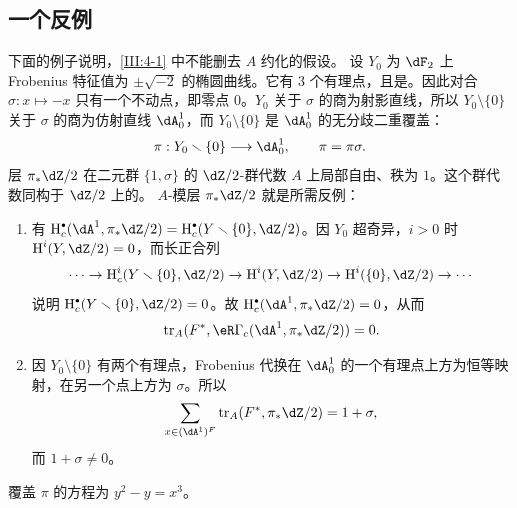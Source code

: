 \subsection{一个反例}\label{III:4-5}
下面的例子说明，\ref{III:4-1} 中不能删去 $A$ 约化的假设。
设 $Y_0$ 为 $\dF_2$ 上 Frobenius 特征值为 $\pm\sqrt{-2}$ 的椭圆曲线。它有 $3$ 个有理点，且是。因此对合 $\sigma:x\mapsto-x$ 只有一个不动点，即零点 $0$。$Y_0$ 关于 $\sigma$ 的商为射影直线，所以 $Y_0\setminus\{0\}$ 关于 $\sigma$ 的商为仿射直线 $\dA_0^1$，而 $Y_0\setminus\{0\}$ 是 $\dA_0^1$ 的无分歧二重覆盖：
\[\pi:Y_0\setminus\{0\}\longrightarrow\dA_0^1,\qquad\pi=\pi\sigma.\]
层 $\pi_*\dZ/2$ 在二元群 $\{1,\sigma\}$ 的 $\dZ/2$-群代数 $A$ 上局部自由、秩为 $1$。这个群代数同构于 $\dZ/2$ 上的。
$A$-模层 $\pi_*\dZ/2$ 就是所需反例：
\begin{enumerate}[\indent a)]
\item 有 $\h_c^\bullet(\dA^1,\pi_*\dZ/2)=\h_c^\bullet(Y\setminus\{0\},\dZ/2)$。因 $Y_0$ 超奇异，$i>0$ 时 $\h^i(Y,\dZ/2)=0$，而长正合列
\[\cdots\to\h_c^i(Y\setminus\{0\},\dZ/2)\to\h^i(Y,\dZ/2)\to\h^i(\{0\},\dZ/2)\to\cdots\]
说明 $\h_c^\bullet(Y\setminus\{0\},\dZ/2)=0$。故 $\h_c^\bullet(\dA^1,\pi_*\dZ/2)=0$，从而
\[\tr_A(F^*,\eR\Gamma_c(\dA^1,\pi_*\dZ/2))=0.\]
\item 因 $Y_0\setminus\{0\}$ 有两个有理点，Frobenius 代换在 $\dA_0^1$ 的一个有理点上方为恒等映射，在另一个点上方为 $\sigma$。所以
\[\sum_{x\in(\dA^1)^F}\tr_A(F^*,\pi_*\dZ/2)=1+\sigma,\]
而 $1+\sigma\ne0$。
\end{enumerate}
覆盖 $\pi$ 的方程为 $y^2-y=x^3$。
